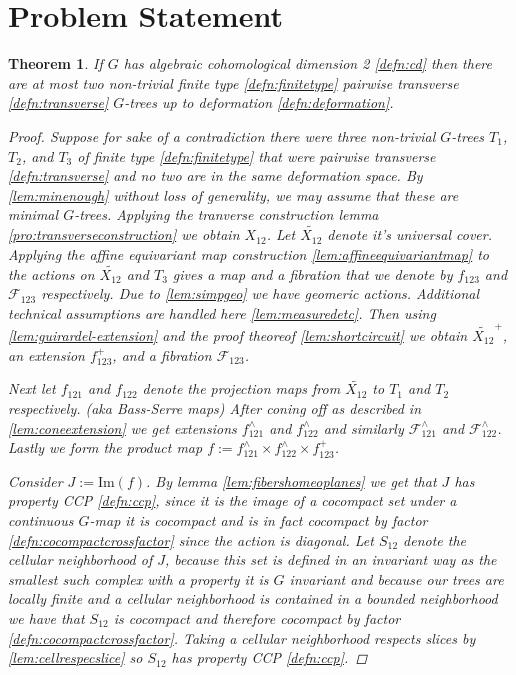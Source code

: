 \documentclass{article}
\theoremstyle{mystyle}
\newtheorem{thm}{Theorem}[section]
\theoremstyle{remark}
\begin{document}
\tableofcontents

\section{Problem Statement}

\begin{thm}
    If \(G\) has algebraic cohomological dimension 2 \ref{defn:cd}  then there are at most two non-trivial finite type \ref{defn:finitetype} pairwise transverse \ref{defn:transverse} \(G\)-trees up to deformation \ref{defn:deformation}.
    \begin{proof}
        Suppose for sake of a contradiction there were three non-trivial \(G\)-trees \(T_{1}\), \(T_{2}\), and \(T_{3}\) of finite type \ref{defn:finitetype} that were pairwise transverse \ref{defn:transverse} and no two are in the same deformation space. By \ref{lem:minenough} without loss of generality, we may assume that these are minimal \(G\)-trees.  Applying the tranverse construction lemma \ref{pro:transverseconstruction} we obtain \(X_{12}\). Let \(\widetilde {X_{12}}\) denote it's universal cover. Applying the affine equivariant map construction \ref{lem:affineequivariantmap} to the actions on \(\widetilde {X_{12}}\) and \(T_{3}\) gives a map and a fibration that we denote by \(f_{123}\) and \(\mathscr{F}_{123}\) respectively.  Due to \ref{lem:simpgeo} we have geomeric actions. Additional technical assumptions are handled here \ref{lem:measuredetc}. Then using \ref{lem:guirardel-extension} and the proof theoreof \ref{lem:shortcircuit} we obtain \({\widetilde {X_{12}}}^{+} \), an extension  \(f_{123}^{+}\), and a fibration \(\mathscr{F}_{123}\).  

        Next let  \(f_{121}\) and  \(f_{122}\)  denote the projection  maps from \(\widetilde {X_{12}}\) to \(T_{1}\) and \(T_{2}\) respectively. (aka Bass-Serre maps) After coning off as described in \ref{lem:coneextension} we get extensions \(f_{121}^{\wedge}\) and \(f_{122}^{\wedge}\) and similarly \(\mathscr{F}^{\wedge}_{121}\) and \(\mathscr{F}^{\wedge}_{122}\). Lastly we form the product map \(f:= f_{121}^{\wedge} \times f_{122}^{\wedge} \times f_{123}^{+}\). 

        Consider \(J := \text{Im}(f)\). By lemma \ref{lem:fibershomeoplanes} we get that \(J\) has property CCP \ref{defn:ccp}, since it is the image of a cocompact set under a continuous \(G\)-map it is cocompact and is in fact cocompact by factor \ref{defn:cocompactcrossfactor} since the action is diagonal. Let \(S_{12}\) denote the cellular neighborhood of \(J\), because this set is defined in an invariant way as the smallest such complex with a property it is \(G\) invariant and because our trees are locally finite and a cellular neighborhood is contained in a bounded neighborhood we have that \(S_{12}\) is cocompact and therefore cocompact by factor \ref{defn:cocompactcrossfactor}. Taking a cellular neighborhood respects slices by \ref{lem:cellrespecslice}  so \(S_{12}\) has property CCP \ref{defn:ccp}. 


\end{proof}
\end{thm}
\end{document}
